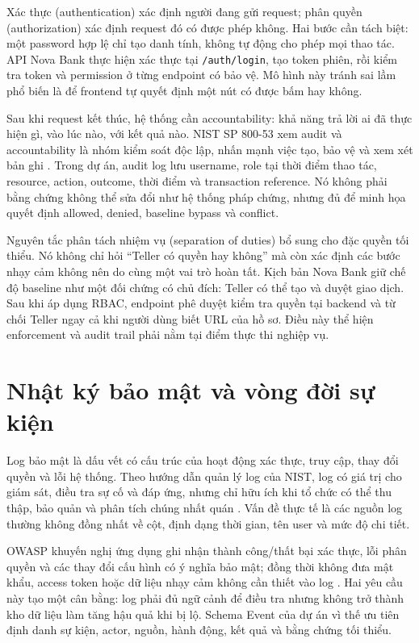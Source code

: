 Xác thực (authentication) xác định người đang gửi request; phân quyền
(authorization) xác định request đó có được phép không. Hai bước cần tách biệt:
một password hợp lệ chỉ tạo danh tính, không tự động cho phép mọi thao tác. API
Nova Bank thực hiện xác thực tại \texttt{/auth/login}, tạo token phiên, rồi
kiểm tra token và permission ở từng endpoint có bảo vệ. Mô hình này tránh sai
lầm phổ biến là để frontend tự quyết định một nút có được bấm hay không.

Sau khi request kết thúc, hệ thống cần accountability: khả năng trả lời ai đã
thực hiện gì, vào lúc nào, với kết quả nào. NIST SP 800-53 xem audit và
accountability là nhóm kiểm soát độc lập, nhấn mạnh việc tạo, bảo vệ và xem xét
bản ghi \citep{JTF2020SP80053}. Trong dự án, audit log lưu username, role tại
thời điểm thao tác, resource, action, outcome, thời điểm và transaction
reference. Nó không phải bằng chứng không thể sửa đổi như hệ thống pháp chứng,
nhưng đủ để minh họa quyết định allowed, denied, baseline bypass và conflict.

Nguyên tắc phân tách nhiệm vụ (separation of duties) bổ sung cho đặc quyền tối
thiểu. Nó không chỉ hỏi ``Teller có quyền hay không'' mà còn xác định các bước
nhạy cảm không nên do cùng một vai trò hoàn tất. Kịch bản Nova Bank giữ chế độ
baseline như một đối chứng có chủ đích: Teller có thể tạo và duyệt giao dịch.
Sau khi áp dụng RBAC, endpoint phê duyệt kiểm tra quyền tại backend và từ chối
Teller ngay cả khi người dùng biết URL của hồ sơ. Điều này thể hiện enforcement
và audit trail phải nằm tại điểm thực thi nghiệp vụ.

\section{Nhật ký bảo mật và vòng đời sự kiện}

Log bảo mật là dấu vết có cấu trúc của hoạt động xác thực, truy cập, thay đổi
quyền và lỗi hệ thống. Theo hướng dẫn quản lý log của NIST, log có giá trị cho
giám sát, điều tra sự cố và đáp ứng, nhưng chỉ hữu ích khi tổ chức có thể thu
thập, bảo quản và phân tích chúng nhất quán \citep{Kent2006SP80092}. Vấn đề
thực tế là các nguồn log thường không đồng nhất về cột, định dạng thời gian,
tên user và mức độ chi tiết.

OWASP khuyến nghị ứng dụng ghi nhận thành công/thất bại xác thực, lỗi phân
quyền và các thay đổi cấu hình có ý nghĩa bảo mật; đồng thời không đưa mật
khẩu, access token hoặc dữ liệu nhạy cảm không cần thiết vào log
\citep{OWASPLogging}. Hai yêu cầu này tạo một cân bằng: log phải đủ ngữ cảnh để
điều tra nhưng không trở thành kho dữ liệu làm tăng hậu quả khi bị lộ. Schema
Event của dự án vì thế ưu tiên định danh sự kiện, actor, nguồn, hành động, kết
quả và bằng chứng tối thiểu.

